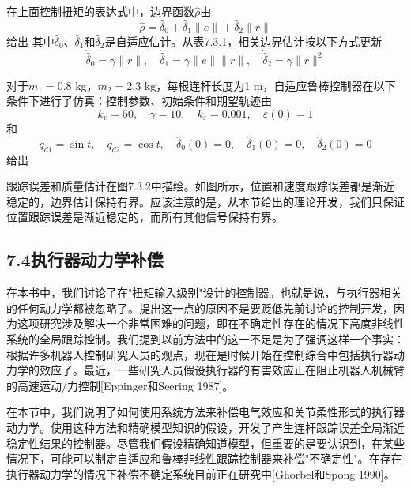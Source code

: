 \documentclass[UTF8]{ctexart}
\begin{document}
在上面控制扭矩的表达式中，边界函数$\hat{\rho}$由
\begin{equation}
\hat{\rho} = \hat{\delta}_0 + \hat{\delta}_1\|e\| + \hat{\delta}_2\|r\|
\end{equation}
给出
其中$\hat{\delta}_0$、$\hat{\delta}_1$和$\hat{\delta}_2$是自适应估计。从表7.3.1，相关边界估计按以下方式更新
\begin{equation}
\dot{\hat{\delta}}_0 = \gamma\|r\|, \quad \dot{\hat{\delta}}_1 = \gamma\|e\|\|r\|, \quad \dot{\hat{\delta}}_2 = \gamma\|r\|^2
\end{equation}

对于$m_1=0.8$ kg，$m_2=2.3$ kg，每根连杆长度为1 m，自适应鲁棒控制器在以下条件下进行了仿真：控制参数、初始条件和期望轨迹由
\begin{equation*}
k_v = 50, \quad \gamma = 10, \quad k_\varepsilon = 0.001, \quad \varepsilon(0) = 1
\end{equation*}
和
\begin{equation*}
q_{d1} = \sin t, \quad q_{d2} = \cos t, \quad \hat{\delta}_0(0) = 0, \quad \hat{\delta}_1(0) = 0, \quad \hat{\delta}_2(0) = 0
\end{equation*}
给出

跟踪误差和质量估计在图7.3.2中描绘。如图所示，位置和速度跟踪误差都是渐近稳定的，边界估计保持有界。应该注意的是，从本节给出的理论开发，我们只保证位置跟踪误差是渐近稳定的，而所有其他信号保持有界。

\subsection*{7.4\quad 执行器动力学补偿}

在本书中，我们讨论了在"扭矩输入级别"设计的控制器。也就是说，与执行器相关的任何动力学都被忽略了。提出这一点的原因不是要贬低先前讨论的控制开发，因为这项研究涉及解决一个非常困难的问题，即在不确定性存在的情况下高度非线性系统的全局跟踪控制。我们提到以前方法中的这一不足是为了强调这样一个事实：根据许多机器人控制研究人员的观点，现在是时候开始在控制综合中包括执行器动力学的效应了。最近，一些研究人员假设执行器的有害效应正在阻止机器人机械臂的高速运动/力控制[Eppinger和Seering 1987]。

在本节中，我们说明了如何使用系统方法来补偿电气效应和关节柔性形式的执行器动力学。使用这种方法和精确模型知识的假设，开发了产生连杆跟踪误差全局渐近稳定性结果的控制器。尽管我们假设精确知道模型，但重要的是要认识到，在某些情况下，可能可以制定自适应和鲁棒非线性跟踪控制器来补偿"不确定性"。在存在执行器动力学的情况下补偿不确定系统目前正在研究中[Ghorbel和Spong 1990]。
\end{document}
